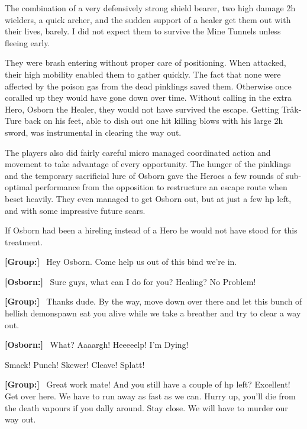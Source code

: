 \begin{readoutloud}
The combination of a very defensively strong shield bearer, two high damage 2h wielders, a quick archer, and the sudden support of a healer get them out with their lives, barely. I did not expect them to survive the Mine Tunnels unless fleeing early.

They were brash entering without proper care of positioning. When attacked, their high mobility enabled them to gather quickly. The fact that none were affected by the poison gas from the dead pinklings saved them. Otherwise once coralled up they would have gone down over time. Without calling in the extra Hero, Osborn the Healer, they would not have survived the escape. Getting Tråk-Ture back on his feet, able to dish out one hit killing blows with his large 2h sword, was instrumental in clearing the way out.

The players also did fairly careful micro managed coordinated action and movement to take advantage of every opportunity. The hunger of the pinklings and the temporary sacrificial lure of Osborn gave the Heroes a few rounds of sub-optimal performance from the opposition to restructure an escape route when beset heavily. They even managed to get Osborn out, but at just a few hp left, and with some impressive future scars.

If Osborn had been a hireling instead of a Hero he would not have stood for this treatment.

\vsmall\textbf{[Group:]}\normalsize ~ Hey Osborn. Come help us out of this bind we're in.

\vsmall\textbf{[Osborn:]}\normalsize ~ Sure guys, what can I do for you? Healing? No Problem!

\vsmall\textbf{[Group:]}\normalsize ~ Thanks dude. By the way, move down over there and let this bunch of hellish demonspawn eat you alive while we take a breather and try to clear a way out.

\vsmall\textbf{[Osborn:]}\normalsize ~ What? Aaaargh! Heeeeelp! I'm Dying!

Smack! Punch! Skewer! Cleave! Splatt!

\vsmall\textbf{[Group:]}\normalsize ~ Great work mate! And you still have a couple of hp left? Excellent! Get over here. We have to run away as fast as we can. Hurry up, you'll die from the death vapours if you dally around. Stay close. We will have to murder our way out.
\end{readoutloud}

\


